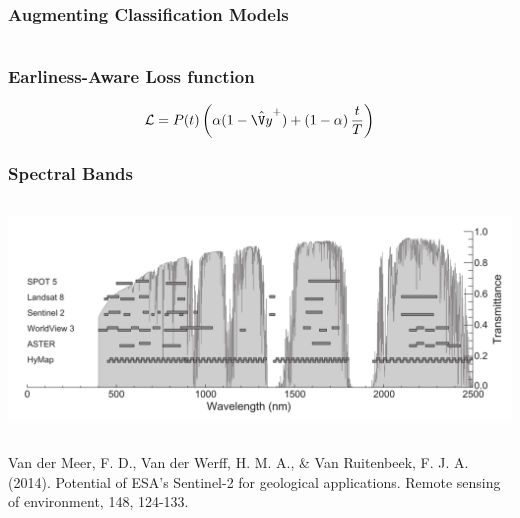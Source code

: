 \begin{frame}
\frametitle{Augmenting Classification Models}

\begin{columns}
	
	\begin{center}
		
		
	\end{center}
	
	
	
\end{columns}

\end{frame}



\begin{frame}
\frametitle{Earliness-Aware Loss function}

\Large

\begin{equation*}
\mathcal{L} = P(t)\left(\alpha (1-\yhat^+) + \left(1-\alpha\right) \frac{t}{T}\right)
\end{equation*}
\end{frame}


\begin{frame}
\frametitle{Spectral Bands}

\begin{columns}
	
	
	\includegraphics[width=\textwidth]{images/Meer14Satellitebands}
	
	
\end{columns}

\vspace{1em}
{\small
	Van der Meer, F. D., Van der Werff, H. M. A., \& Van Ruitenbeek, F. J. A. (2014). Potential of ESA's Sentinel-2 for geological applications. Remote sensing of environment, 148, 124-133.
}

\end{frame}


